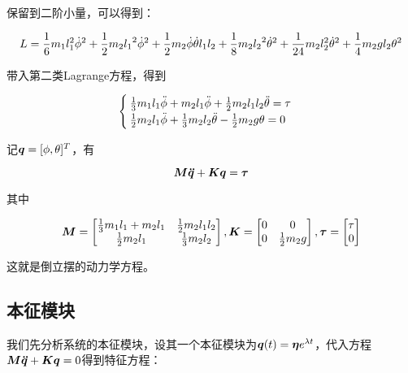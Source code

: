 \documentclass[UTF8]{ctexart}
\begin{document}
保留到二阶小量，可以得到：

\begin{equation}
    L = \frac{1}{6} m_1 l_1^2 {\dot{\phi}}^2
    + \frac{1}{2} m_2 {l_1}^2 {\dot{\phi}}^2
    + \frac{1}{2} m_2 \dot{\phi} \dot{\theta} l_1 l_2
    + \frac{1}{8} m_2 {l_2}^2 {\dot{\theta}}^2
    + \frac{1}{24} m_2 l_2^2 {\dot{\theta}}^2
    + \frac{1}{4} m_2 g l_2\theta^2
\end{equation}

带入第二类Lagrange方程，得到

\begin{equation}
    \begin{cases}
        \frac{1}{3} m_1 l_1 \ddot{\phi} + m_2 l_1 \ddot{\phi} + \frac{1}{2} m_2 l_1 l_2 \ddot{\theta} = \tau\\
        \frac{1}{2} m_2 l_1 \ddot{\phi} + \frac{1}{3} m_2 l_2\ddot{\theta} - \frac{1}{2} m_2 g \theta = 0
    \end{cases}
\end{equation}

记$\boldsymbol{q}=[\phi , \theta]^T$，有

\begin{equation}
    \boldsymbol{M} \boldsymbol{\ddot{q}} + \boldsymbol{K} \boldsymbol{q} = \boldsymbol{\tau}
\end{equation}

其中

\begin{equation}
    \boldsymbol{M} = \begin{bmatrix}
        \frac{1}{3} m_1 l_1 + m_2 l_1 & \frac{1}{2} m_2 l_1 l_2\\
        \frac{1}{2} m_2 l_1  & \frac{1}{3} m_2 l_2
    \end{bmatrix},
    \boldsymbol{K} = \begin{bmatrix}
        0 & 0\\
        0 & \frac{1}{2} m_2 g
    \end{bmatrix},
    \boldsymbol{\tau} = \begin{bmatrix}
        \tau\\
        0
    \end{bmatrix}
\end{equation}

这就是倒立摆的动力学方程。

\subsection{本征模块}

我们先分析系统的本征模块，设其一个本征模块为$\boldsymbol{q}(t) = \boldsymbol{\eta} e^{\lambda t}$，代入方程$\boldsymbol{M} \boldsymbol{\ddot{q}} + \boldsymbol{K} \boldsymbol{q} = 0$得到特征方程：
\end{document}
